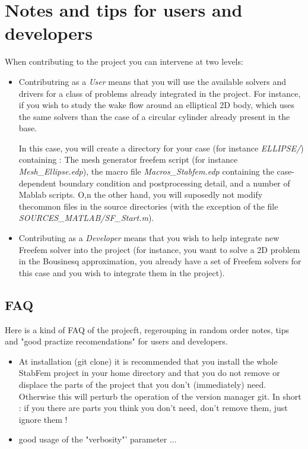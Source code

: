 
\section{Notes and tips for users and developers}

When contributing to the project you can intervene at two levels:

\begin{itemize}

\item Contributring as a {\em User}  means that you will use the available solvers and drivers for a class of problems already integrated 
in the project. For instance, if you wish to study the wake flow around an elliptical 2D body, which uses the same solvers than the case of a circular cylinder already present in the base. 

In this case, you will create a directory for your case (for instance {\em ELLIPSE/}) containing : The mesh generator freefem script 
(for instance {\em Mesh\_Ellipse.edp}), the macro file {\em Macros\_Stabfem.edp}  containing the case-dependent boundary condition and postprocessing detail, and a number of Mablab scripts. O,n the other hand, you will suposedly not modify thecommon files in the source directories (with the exception of the file {\em SOURCES\_MATLAB/SF\_Start.m}).

\item Contributing as a {\em Developer } means that you wish to help integrate new Freefem solver into the project 
(for instance, you want to solve a 2D problem in the Bousinesq approximation, you already have a set of Freefem solvers for this case and you wish to integrate them in the project).

\end{itemize}

 
\subsection{FAQ}
 
 
 
Here is a kind of FAQ of the projecft, regerouping in random order notes, tips and "good practize recomendations" for users and developers.
 


\begin {itemize}

\item
At installation (git clone) it is recommended that you install the whole StabFem project in your home directory and that you do
not remove or displace the parts of the project that you don't (immediately) need. Otherwise this will perturb the operation of the version manager git. 
In short :  if you there are parts you think you don't need, don't remove them, just ignore them !


\item good usage of the "verbosity"' parameter ...


\end{itemize}

